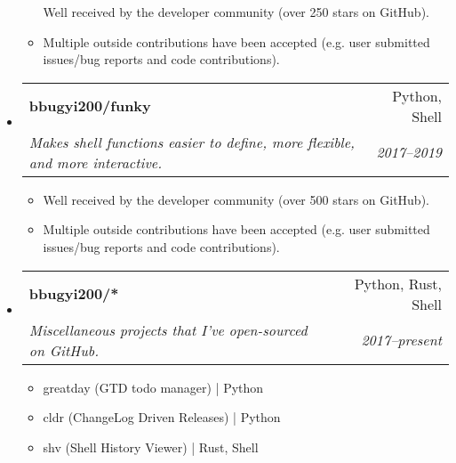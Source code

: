 \documentclass[letterpaper,11pt]{article}
\makeatletter
\newcommand{\ressubheading}[4]{
\begin{tabular*}{6.5in}{l@{\cftdotfill{\cftsecdotsep}\extracolsep{\fill}}r}
		\textbf{#1} & #2 \\
		\textit{#3} & \textit{#4} \\
\end{tabular*}\vspace{-6pt}}
\makeatother
\begin{document}
\begin{itemize}
\begin{itemize}
            Well received by the developer community (over 250 stars on GitHub).
        \item
            Multiple outside contributions have been accepted (e.g. user submitted issues/bug reports and code contributions).
    \end{itemize}
\item \ressubheading{bbugyi200/funky}{Python, Shell}{Makes shell functions easier to define, more flexible, and more interactive.}{2017--2019}
    \begin{itemize}
        \item
            Well received by the developer community (over 500 stars on GitHub).
        \item
            Multiple outside contributions have been accepted (e.g. user submitted issues/bug reports and code contributions).
    \end{itemize}
\item \ressubheading{bbugyi200/*}{Python, Rust, Shell}{Miscellaneous projects that I've open-sourced on GitHub.}{2017--present}
    \begin{itemize}[noitemsep]
        \item greatday (GTD todo manager) | Python
        \item cldr (ChangeLog Driven Releases) | Python
        \item shv (Shell History Viewer) | Rust, Shell
    \end{itemize}
\end{itemize}
\end{document}
